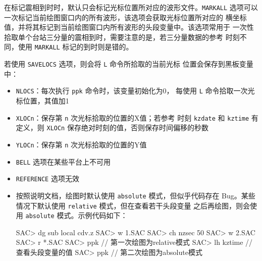 在标记震相到时时，默认只会标记光标位置所对应的波形文件。\texttt{MARKALL}
选项可以一次标记当前绘图窗口内的所有波形，该选项会获取光标位置所对应的
横坐标值，并将其标记到当前绘图窗口内所有波形的头段变量中。该选项常用于
一次性拾取单个台站三分量的震相到时，需要注意的是，若三分量数据的参考
时刻不同，使用 \texttt{MARKALL} 标记的到时则是错的。

若使用 \texttt{SAVELOCS} 选项，则会将 \texttt{L} 命令所拾取的当前光标
位置会保存到黑板变量中：
\begin{itemize}
\item \texttt{NLOCS}：每次执行 \texttt{ppk} 命令时，该变量初始化为0，
    每使用 \texttt{L} 命令拾取一次光标位置，其值加1
\item \texttt{XLOCn}：保存第 \texttt{n} 次光标拾取的位置的X值；若参考
    时刻 \texttt{kzdate} 和 \texttt{kztime} 有定义，则 \texttt{XLOCn}
    保存绝对时刻的值，否则保存时间偏移的秒数
\item \texttt{YLOCn}：保存第 \texttt{n} 次光标拾取的位置的Y值
\end{itemize}

\begin{itemize}
\item \texttt{BELL} 选项在某些平台上不可用
\item \texttt{REFERENCE} 选项无效
\item 按照说明文档，绘图时默认使用 \texttt{absolute} 模式，但似乎代码存在
    Bug。某些情况下默认使用 \texttt{relative} 模式，但在查看若干头段变量
    之后再绘图，则会使用 \texttt{absolute} 模式。示例代码如下：
\begin{SACCode}
SAC> dg sub local cdv.z
SAC> w 1.SAC
SAC> ch nzsec 50
SAC> w 2.SAC
SAC> r *.SAC
SAC> ppk            // 第一次绘图为relative模式
SAC> lh kztime      // 查看头段变量的值
SAC> ppk            // 第二次绘图为absolute模式
\end{SACCode}
\end{itemize}
